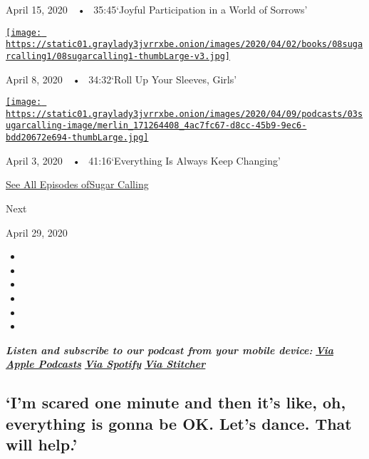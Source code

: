 April 15, 2020~~•~ 35:45`Joyful Participation in a World of Sorrows'

\href{https://www.nytimes3xbfgragh.onion/2020/04/08/podcasts/sugar-calling-margaret-atwood-coronavirus.html?action=click\&module=audio-series-bar\&region=header\&pgtype=Article}{\texttt{[image: https://static01.graylady3jvrrxbe.onion/images/2020/04/02/books/08sugarcalling1/08sugarcalling1-thumbLarge-v3.jpg]}}

April 8, 2020~~•~ 34:32`Roll Up Your Sleeves, Girls'

\href{https://www.nytimes3xbfgragh.onion/2020/04/03/podcasts/sugar-calling-george-saunders-coronavirus.html?action=click\&module=audio-series-bar\&region=header\&pgtype=Article}{\texttt{[image: https://static01.graylady3jvrrxbe.onion/images/2020/04/09/podcasts/03sugarcalling-image/merlin\_171264408\_4ac7fc67-d8cc-45b9-9ec6-bdd20672e694-thumbLarge.jpg]}}

April 3, 2020~~•~ 41:16`Everything Is Always Keep Changing'

\href{https://www.nytimes3xbfgragh.onion/column/sugar-calling}{See All
Episodes ofSugar Calling}

Next

April 29, 2020

\begin{itemize}
\item
\item
\item
\item
\item
\item
\end{itemize}

\emph{\textbf{Listen and subscribe to our podcast from your mobile
device:}}
\textbf{\href{https://podcasts.apple.com/us/podcast/sugar-calling/id1505881384}{\emph{Via
Apple Podcasts}}} \emph{\textbf{\textbar{}}}
\textbf{\href{https://open.spotify.com/show/4U8hPiNGIBvTS9zLeiDCN7?si=gRyigD47SPWl-QWgNjgt2w}{\emph{Via
Spotify}}} \emph{\textbf{\textbar{}}}
\textbf{\href{https://www.stitcher.com/podcast/the-new-york-times/sugar-calling}{\emph{Via
Stitcher}}}

\hypertarget{im-scared-one-minute-and-then-its-like-oh-everything-is-gonna-be-ok-lets-dance-that-will-help}{%
\subsection{`I'm scared one minute and then it's like, oh, everything is
gonna be OK. Let's dance. That will
help.'}\label{im-scared-one-minute-and-then-its-like-oh-everything-is-gonna-be-ok-lets-dance-that-will-help}}

